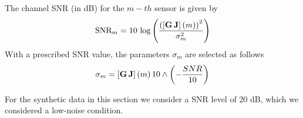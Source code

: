 The channel SNR (in dB) for the $m-th$ sensor is given by
\begin{equation}
\text{SNR}_m = 
10\, \log\left(  \frac{ \left(  \left[ \mathbf{G}\, \mathbf{J} \right](m) \right)^2 }{\sigma_m^2}  \right)
\end{equation}
With a prescribed SNR value, the parameters $\sigma_m$ are selected as follows
\begin{equation}
\sigma_m = 
\left[ \mathbf{G}\, \mathbf{J} \right](m)\,
10\wedge \left( -\frac{SNR}{10} \right)
\end{equation}

For the synthetic data in this section we consider a SNR level of 20 dB, which we considered a low-noise condition.



%
%
%
%
%

